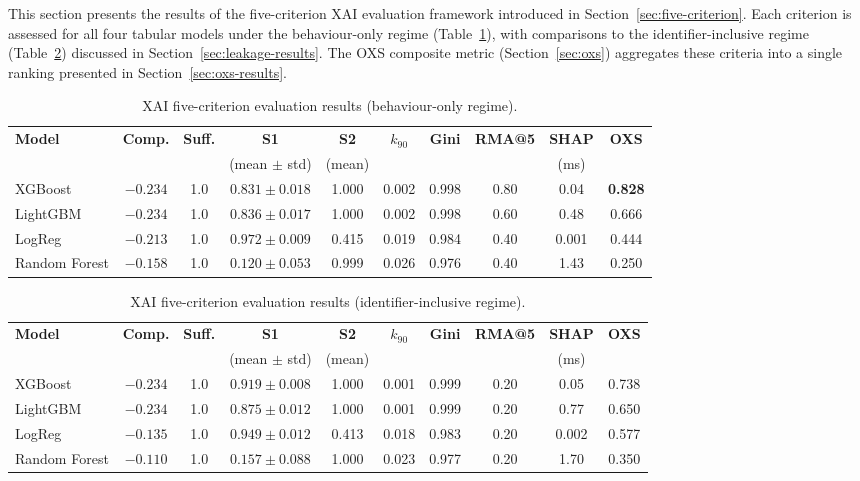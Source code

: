 \documentclass[12pt,a4paper]{report}
\begin{document}
This section presents the results of the five-criterion XAI evaluation framework introduced in Section~\ref{sec:five-criterion}. Each criterion is assessed for all four tabular models under the behaviour-only regime (Table~\ref{tab:xai-behav}), with comparisons to the identifier-inclusive regime (Table~\ref{tab:xai-ident}) discussed in Section~\ref{sec:leakage-results}. The OXS composite metric (Section~\ref{sec:oxs}) aggregates these criteria into a single ranking presented in Section~\ref{sec:oxs-results}.

\begin{table}[H]
\centering
\caption{XAI five-criterion evaluation results (behaviour-only regime).}
\label{tab:xai-behav}
\small
\begin{tabular}{lccccccccc}
\toprule
\textbf{Model} & \textbf{Comp.} & \textbf{Suff.} & \textbf{S1} & \textbf{S2} & \textbf{$k_{90}$} & \textbf{Gini} & \textbf{RMA@5} & \textbf{SHAP} & \textbf{OXS} \\
 & & & (mean $\pm$ std) & (mean) & & & & (ms) & \\
\midrule
XGBoost & $-0.234$ & 1.0 & $0.831 \pm 0.018$ & 1.000 & 0.002 & 0.998 & 0.80 & 0.04 & \textbf{0.828} \\
LightGBM & $-0.234$ & 1.0 & $0.836 \pm 0.017$ & 1.000 & 0.002 & 0.998 & 0.60 & 0.48 & 0.666 \\
LogReg & $-0.213$ & 1.0 & $0.972 \pm 0.009$ & 0.415 & 0.019 & 0.984 & 0.40 & 0.001 & 0.444 \\
Random Forest & $-0.158$ & 1.0 & $0.120 \pm 0.053$ & 0.999 & 0.026 & 0.976 & 0.40 & 1.43 & 0.250 \\
\bottomrule
\end{tabular}
\end{table}

\begin{table}[H]
\centering
\caption{XAI five-criterion evaluation results (identifier-inclusive regime).}
\label{tab:xai-ident}
\small
\begin{tabular}{lccccccccc}
\toprule
\textbf{Model} & \textbf{Comp.} & \textbf{Suff.} & \textbf{S1} & \textbf{S2} & \textbf{$k_{90}$} & \textbf{Gini} & \textbf{RMA@5} & \textbf{SHAP} & \textbf{OXS} \\
 & & & (mean $\pm$ std) & (mean) & & & & (ms) & \\
\midrule
XGBoost & $-0.234$ & 1.0 & $0.919 \pm 0.008$ & 1.000 & 0.001 & 0.999 & 0.20 & 0.05 & 0.738 \\
LightGBM & $-0.234$ & 1.0 & $0.875 \pm 0.012$ & 1.000 & 0.001 & 0.999 & 0.20 & 0.77 & 0.650 \\
LogReg & $-0.135$ & 1.0 & $0.949 \pm 0.012$ & 0.413 & 0.018 & 0.983 & 0.20 & 0.002 & 0.577 \\
Random Forest & $-0.110$ & 1.0 & $0.157 \pm 0.088$ & 1.000 & 0.023 & 0.977 & 0.20 & 1.70 & 0.350 \\
\bottomrule
\end{tabular}
\end{table}
\end{document}
